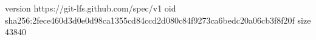 version https://git-lfs.github.com/spec/v1
oid sha256:2fece460d3d0e0d98ca1355cd84ccd2d080c84f9273ca6bedc20a06cb3f8f20f
size 43840
